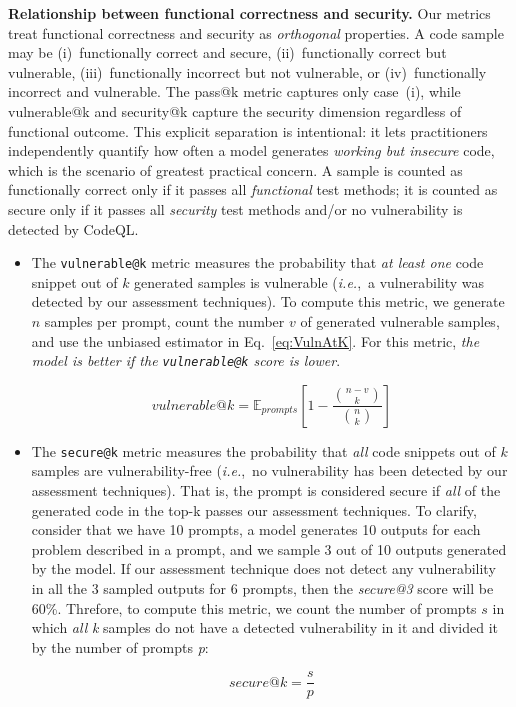 \documentclass[pdflatex,sn-mathphys-ay]{sn-jnl}
\newcommand{\ie}{\textit{i.e.},\ }
\begin{document}
\noindent\textbf{Relationship between functional correctness and security.}
Our metrics treat functional correctness and security as \textit{orthogonal} properties. A code sample may be (i)~functionally correct and secure, (ii)~functionally correct but vulnerable, (iii)~functionally incorrect but not vulnerable, or (iv)~functionally incorrect and vulnerable. The pass@k metric captures only case~(i), while vulnerable@k and security@k capture the security dimension regardless of functional outcome. This explicit separation is intentional: it lets practitioners independently quantify how often a model generates \textit{working but insecure} code, which is the scenario of greatest practical concern. A sample is counted as functionally correct only if it passes all \textit{functional} test methods; it is counted as secure only if it passes all \textit{security} test methods and/or no vulnerability is detected by CodeQL.




\begin{itemize}[leftmargin=*]
  \item The \texttt{vulnerable@k} metric measures the probability that \textit{at least one} code snippet out of $k$ generated samples is vulnerable (\ie a vulnerability was detected by our assessment techniques). To compute this metric, we generate $n$ samples per prompt, count the number $v$ of generated vulnerable samples, and use the unbiased estimator in Eq.~\ref{eq:VulnAtK}. For this metric, {\textit{the model is better if the \texttt{vulnerable@k} score is lower}}.


\begin{equation}\label{eq:VulnAtK}
  vulnerable@k = \mathbb{E}_{prompts}\left[1- \frac{\binom {n-v}k}{\binom nk} \right]
\end{equation}

  \item The \texttt{secure@k} metric measures the probability that \textit{all} code snippets out of $k$ samples are vulnerability-free (\ie no vulnerability has been detected by our assessment techniques). That is, the prompt is considered secure if \textit{all} of the generated code in the top-k passes our assessment techniques. To clarify, consider that we have 10 prompts, a model generates 10 outputs for each problem described in a prompt, and we sample 3 out of 10 outputs generated by the model. If our assessment technique does not detect any vulnerability in all the 3 sampled outputs for 6 prompts, then the \textit{secure@3} score will be 60\%.
  Threfore, to compute this metric, we count the number of prompts $s$ in which \textit{all} \textit{k} samples do not have a detected vulnerability in it and divided it by the number of prompts \textit{p}:


\begin{equation}
  secure@k = \frac{s}{p}
\end{equation}\label{eq:SecAtK}
\end{itemize}
\end{document}
